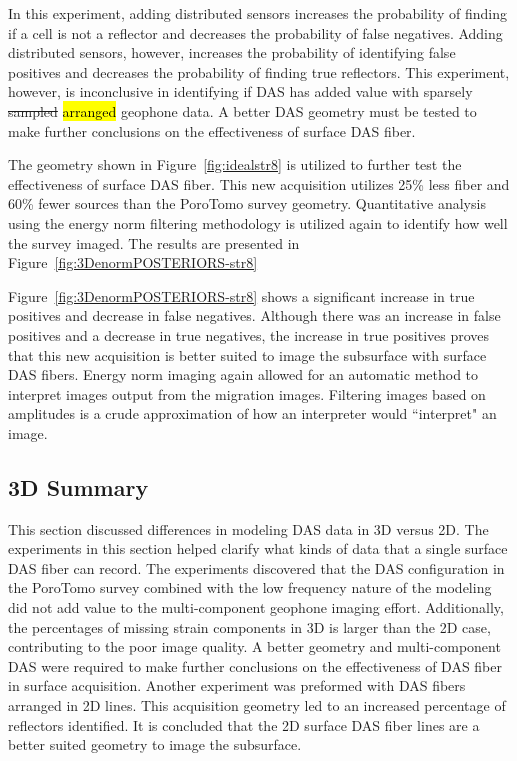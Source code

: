 In this experiment, adding distributed sensors increases the probability of finding if a cell is not a reflector and decreases the probability of false negatives. Adding distributed sensors, however, increases the probability of identifying false positives and decreases the probability of finding true reflectors. This experiment, however, is inconclusive in identifying if DAS has added value with sparsely \sout{sampled} \hl{arranged} geophone data. A better DAS geometry must be tested to make further conclusions on the effectiveness of surface DAS fiber.

The geometry shown in Figure~\ref{fig:idealstr8} is utilized to further test the effectiveness of surface DAS fiber. This new acquisition utilizes 25\% less fiber and 60\% fewer sources than the PoroTomo survey geometry. Quantitative analysis using the energy norm filtering methodology is utilized again to identify how well the survey imaged. The results are presented in Figure~\ref{fig:3DenormPOSTERIORS-str8}



Figure~\ref{fig:3DenormPOSTERIORS-str8} shows a significant increase in true positives and decrease in false negatives. Although there was an increase in false positives and a decrease in true negatives, the increase in true positives proves that this new acquisition is better suited to image the subsurface with surface DAS fibers. Energy norm imaging again allowed for an automatic method to interpret images output from the migration images. Filtering images based on amplitudes is a crude approximation of how an interpreter would ``interpret" an image.

\subsection{3D Summary}
This section discussed differences in modeling DAS data in 3D versus 2D. The experiments in this section helped clarify what kinds of data that a single surface DAS fiber can record. The experiments discovered that the DAS configuration in the PoroTomo survey combined with the low frequency nature of the modeling did not add value to the multi-component geophone imaging effort. Additionally, the percentages of missing strain components in 3D is larger than the 2D case, contributing to the poor image quality. A better geometry and multi-component DAS were required to make further conclusions on the effectiveness of DAS fiber in surface acquisition. Another experiment was preformed with DAS fibers arranged in 2D lines. This acquisition geometry led to an increased percentage of reflectors identified. It is concluded that the 2D surface DAS fiber lines are a better suited geometry to image the subsurface.

